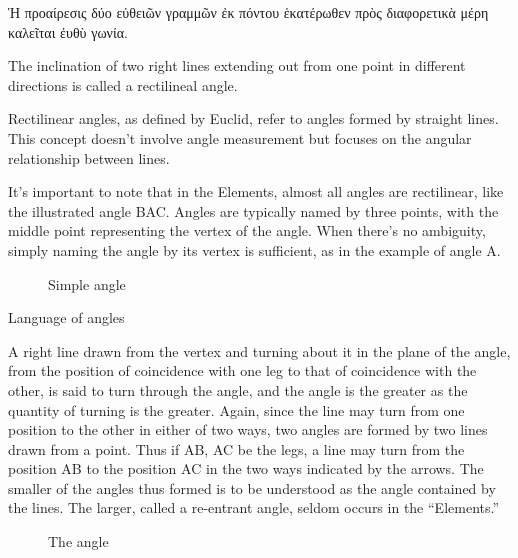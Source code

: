 
\begin{defin}
\textgreek{Ἡ προαίρεσις δύο εὐθειῶν γραμμῶν ἐκ πόντου ἑκατέρωθεν πρὸς διαφορετικὰ μέρη καλεῖται ἐυθὺ γωνία.}

The inclination of two right lines extending out from one point in different directions is called a rectilineal angle.
\end{defin}

Rectilinear angles, as defined by Euclid, refer to angles formed by straight lines.\cite{Euclid} This concept doesn't involve angle measurement but focuses on the angular relationship between lines.

It's important to note that in the Elements, almost all angles are rectilinear, like the illustrated angle BAC. Angles are typically named by three points, with the middle point representing the vertex of the angle. When there's no ambiguity, simply naming the angle by its vertex is sufficient, as in the example of angle A.

\begin{figure}[h]
	\centering
	\caption{Simple angle}
\end{figure}

\begin{subdefin}
Language of angles
\end{subdefin}

A right line drawn from the vertex and turning about it in the plane of the angle, from the position of coincidence with one leg to that of coincidence with the other, is said to turn through the angle, and the angle is the greater as the quantity of turning is the greater. Again, since the line may turn from one position to the other in either of two ways, two angles are formed by two lines drawn from a point.
Thus if AB, AC be the legs, a line may turn from the position AB to the position AC in the two ways indicated by the arrows. The smaller of the angles thus formed is to be understood as the angle contained by the lines. The larger, called a re-entrant angle, seldom occurs in the “Elements.”

\begin{figure}[H]
	\centering
		\caption{The angle}
\end{figure}



